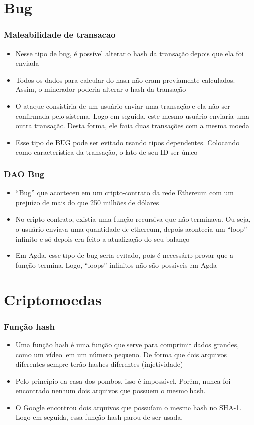 \documentclass{beamer}
\begin{document}
\section{Bug}

 \begin{frame}
   \frametitle{Maleabilidade de transacao}
\begin{itemize}
  \item Nesse tipo de bug, é possível alterar o hash da transação depois que ela foi enviada
  \item Todos os dados para calcular do hash não eram previamente calculados. Assim, o minerador poderia alterar o hash da transação
  \item O ataque consistiria de um usuário enviar uma transação e ela não ser confirmada pelo sistema.
    Logo em seguida, este mesmo usuário enviaria uma outra transação. Desta forma, ele faria duas transações com a mesma moeda
  \item Esse tipo de BUG pode ser evitado usando tipos dependentes.
    Colocando como característica da transação, o fato de seu ID ser único
\end{itemize}
\end{frame}

\begin{frame}
  \frametitle{DAO Bug}
  \begin{itemize}
    \item \foreignquote{english}{Bug} que aconteceu em um cripto-contrato da rede Ethereum com um prejuízo de mais do que 250 milhões de dólares
      \cite{wood2014ethereum}
    \item No cripto-contrato, existia uma função recursiva que não terminava.
      Ou seja, o usuário enviava uma quantidade de ethereum,
      depois acontecia um \foreignquote{english}{loop} infinito e só depois era feito a atualização do seu balanço
    \item Em Agda, esse tipo de bug seria evitado, pois é necessário provar que a função termina.
      Logo, \foreignquote{english}{loops} infinitos não são possíveis em Agda
  \end{itemize}
\end{frame}

\section{Criptomoedas}
\begin{frame}
  \frametitle{Função hash}
  \begin{itemize}
    \item Uma função hash é uma função que serve para comprimir dados grandes, como um vídeo,
      em um número pequeno.
      De forma que dois arquivos diferentes sempre terão hashes diferentes (injetividade)
    \item Pelo princípio da casa dos pombos, isso é impossível.
      Porém, nunca foi encontrado nenhum dois arquivos que possuem o mesmo hash.
    \item O Google encontrou dois arquivos que possuíam o mesmo hash no SHA-1.
      Logo em seguida, essa função hash parou de ser usada.
  \end{itemize}
\end{frame}
\end{document}
